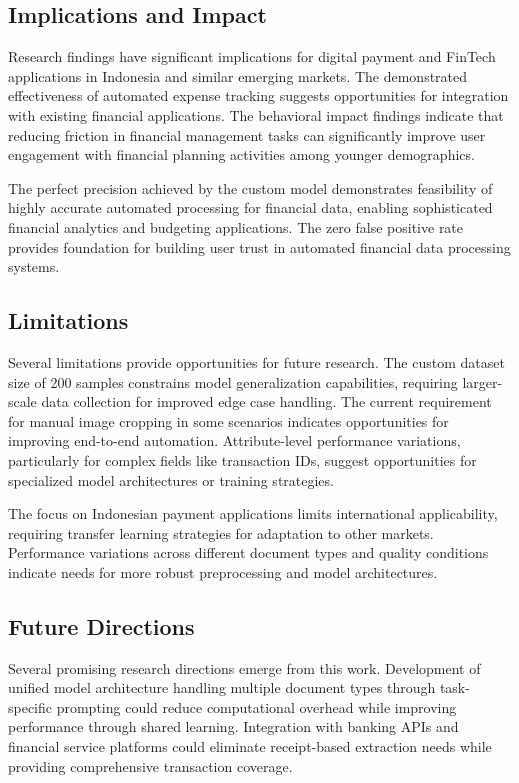 \subsection{Implications and Impact}
Research findings have significant implications for digital payment and FinTech applications in Indonesia and similar emerging markets. The demonstrated effectiveness of automated expense tracking suggests opportunities for integration with existing financial applications. The behavioral impact findings indicate that reducing friction in financial management tasks can significantly improve user engagement with financial planning activities among younger demographics.

The perfect precision achieved by the custom model demonstrates feasibility of highly accurate automated processing for financial data, enabling sophisticated financial analytics and budgeting applications. The zero false positive rate provides foundation for building user trust in automated financial data processing systems.

\subsection{Limitations}
Several limitations provide opportunities for future research. The custom dataset size of 200 samples constrains model generalization capabilities, requiring larger-scale data collection for improved edge case handling. The current requirement for manual image cropping in some scenarios indicates opportunities for improving end-to-end automation. Attribute-level performance variations, particularly for complex fields like transaction IDs, suggest opportunities for specialized model architectures or training strategies.

The focus on Indonesian payment applications limits international applicability, requiring transfer learning strategies for adaptation to other markets. Performance variations across different document types and quality conditions indicate needs for more robust preprocessing and model architectures.

\subsection{Future Directions}
Several promising research directions emerge from this work. Development of unified model architecture handling multiple document types through task-specific prompting could reduce computational overhead while improving performance through shared learning. Integration with banking APIs and financial service platforms could eliminate receipt-based extraction needs while providing comprehensive transaction coverage.

